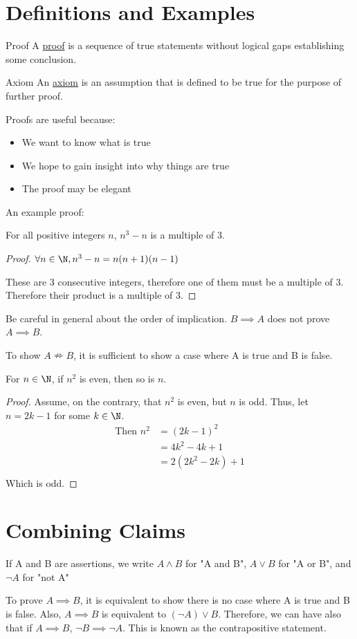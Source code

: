 \documentclass[../Main.tex]{subfiles}
\begin{document}
\section{Definitions and Examples}
\begin{definition}{Proof}
    A \underline{proof} is a sequence of true statements without logical gaps establishing some conclusion.
\end{definition}
\begin{definition}{Axiom}
    An \underline{axiom} is an assumption that is defined to be true for the purpose of further proof.
\end{definition}
Proofs are useful because:
\begin{itemize}
    \item We want to know what is true
    \item We hope to gain insight into why things are true
    \item The proof may be elegant
\end{itemize}
An example proof:
\begin{proposition}
    For all positive integers $n$, $n^3 - n$ is a multiple of 3.
\end{proposition}
\begin{proof}
    $\forall n \in \N, n^3-n=n(n+1)(n-1)$\par
    These are 3 consecutive integers, therefore one of them must be a multiple of 3. Therefore their product is a multiple of 3.
\end{proof}
Be careful in general about the order of implication. $B \implies A$ does not prove $A \implies B$.\par
To show $A \nRightarrow B$, it is sufficient to show a case where A is true and B is false.
\begin{proposition}
    For $n \in \N$, if $n^2$ is even, then so is $n$.
\end{proposition}
\begin{proof}
    Assume, on the contrary, that $n^2$ is even, but $n$ is odd.
    Thus, let $n=2k-1$ for some $k \in \N$.
    \begin{align*}
        \text{Then } n^2 &= (2k-1)^2 \\
        &= 4k^2-4k+1 \\
        &=2(2k^2-2k)+1 \\
    \end{align*}
    Which is odd. \contradiction
\end{proof}
\section{Combining Claims}
If A and B are assertions, we write $A \land B$ for "A and B", $A \lor B$ for "A or B", and $\lnot A$ for "not A"\par
To prove $A \implies B$, it is equivalent to show there is no case where A is true and B is false. Also, $A \implies B$ is equivalent to $(\lnot A) \lor B$. Therefore, we can have also that if $A \implies B$, $\lnot B \implies \lnot A$. This is known as the contrapositive statement.
\end{document}
